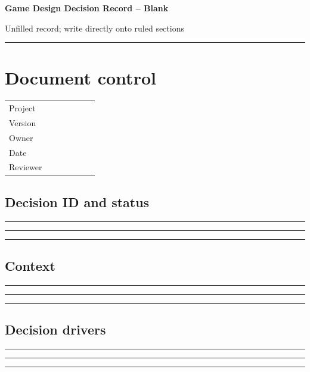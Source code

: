 \documentclass[11pt]{article}
\begin{document}
{\huge\bfseries\color{suiteblue} Game Design Decision Record -- Blank}\par
\vspace{0.15in}
{\normalsize\color{suitegray} Unfilled record; write directly onto ruled sections}\par
\vspace{0.15in}\hrule\vspace{0.15in}

\section{Document control}
\renewcommand{\arraystretch}{1.8}
\begin{tabularx}{\linewidth}{@{}p{0.30\linewidth}X@{}}\toprule
Project & \hrulefill\\ Version & \hrulefill\\ Owner & \hrulefill\\ Date & \hrulefill\\ Reviewer & \hrulefill\\ \bottomrule\end{tabularx}

\subsection{Decision ID and status}
\noindent\rule{\linewidth}{0.3pt}\par\vspace{0.18in}
\noindent\rule{\linewidth}{0.3pt}\par\vspace{0.18in}
\noindent\rule{\linewidth}{0.3pt}\par\vspace{0.14in}

\subsection{Context}
\noindent\rule{\linewidth}{0.3pt}\par\vspace{0.18in}
\noindent\rule{\linewidth}{0.3pt}\par\vspace{0.18in}
\noindent\rule{\linewidth}{0.3pt}\par\vspace{0.14in}

\subsection{Decision drivers}
\noindent\rule{\linewidth}{0.3pt}\par\vspace{0.18in}
\noindent\rule{\linewidth}{0.3pt}\par\vspace{0.18in}
\noindent\rule{\linewidth}{0.3pt}\par\vspace{0.14in}
\end{document}
